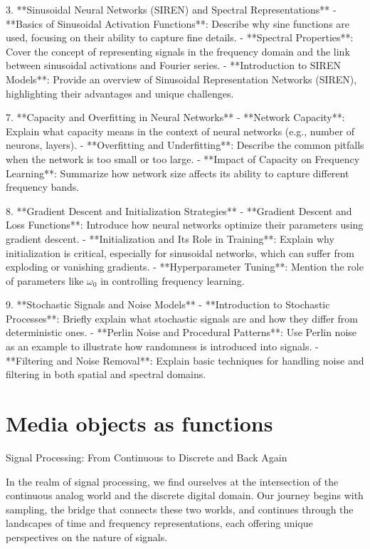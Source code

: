  3. **Sinusoidal Neural Networks (SIREN) and Spectral Representations**
   - **Basics of Sinusoidal Activation Functions**: Describe why sine functions are used, focusing on their ability to capture fine details.
   - **Spectral Properties**: Cover the concept of representing signals in the frequency domain and the link between sinusoidal activations and Fourier series.
   - **Introduction to SIREN Models**: Provide an overview of Sinusoidal Representation Networks (SIREN), highlighting their advantages and unique challenges.


 7. **Capacity and Overfitting in Neural Networks**
   - **Network Capacity**: Explain what capacity means in the context of neural networks (e.g., number of neurons, layers).
   - **Overfitting and Underfitting**: Describe the common pitfalls when the network is too small or too large.
   - **Impact of Capacity on Frequency Learning**: Summarize how network size affects its ability to capture different frequency bands.

 8. **Gradient Descent and Initialization Strategies**
   - **Gradient Descent and Loss Functions**: Introduce how neural networks optimize their parameters using gradient descent.
   - **Initialization and Its Role in Training**: Explain why initialization is critical, especially for sinusoidal networks, which can suffer from exploding or vanishing gradients.
   - **Hyperparameter Tuning**: Mention the role of parameters like \(\omega_0\) in controlling frequency learning.

 9. **Stochastic Signals and Noise Models**
   - **Introduction to Stochastic Processes**: Briefly explain what stochastic signals are and how they differ from deterministic ones.
   - **Perlin Noise and Procedural Patterns**: Use Perlin noise as an example to illustrate how randomness is introduced into signals.
   - **Filtering and Noise Removal**: Explain basic techniques for handling noise and filtering in both spatial and spectral domains.


\section{Media objects as functions}

Signal Processing: From Continuous to Discrete and Back Again

In the realm of signal processing, we find ourselves at the intersection of the continuous analog world and the discrete digital domain. Our journey begins with sampling, the bridge that connects these two worlds, and continues through the landscapes of time and frequency representations, each offering unique perspectives on the nature of signals.

